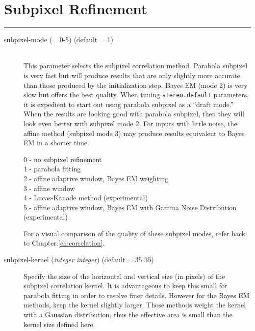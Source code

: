 \section{Subpixel Refinement}
\hrule
\bigskip

\begin{description}

\item[subpixel-mode \textnormal{\small{(= 0-5)}} (default = 1)] \hfill \\
  This parameter selects the subpixel correlation method. Parabola subpixel
  is very fast but will produce results that are only slightly more accurate
   than those produced by the initialization step. Bayes EM (mode 2)
  is very slow but offers the best quality. When tuning {\tt stereo.default}
  parameters, it is expedient to start out using parabola subpixel as a
  ``draft mode.'' When the results are looking good with parabola subpixel,
  then they  will look even better with subpixel mode 2.  For inputs with
  little noise, the affine method (subpixel mode 3) may produce results
  equivalent to Bayes EM in a shorter time.

  \begin{description}
    \item[0 - no subpixel refinement]
    \item[1 - parabola fitting ]
    \item[2 - affine adaptive window, Bayes EM weighting ]
    \item[3 - affine window ]
    \item[4 - Lucas-Kanade method (experimental)]
    \item[5 - affine adaptive window, Bayes EM with Gamma Noise Distribution (experimental) ]
  \end{description}

  For a visual comparison of the quality of these subpixel modes,
  refer back to Chapter:\ref{ch:correlation}.

\item[subpixel-kernel \textnormal{\small{(\emph{integer integer})}} (default = 35 35)]
  Specify the size of the horizontal and vertical size (in pixels) of
  the subpixel correlation kernel. It is advantageous to keep this
  small for parabola fitting in order to resolve finer
  details. However for the Bayes EM methods, keep the kernel slightly
  larger. Those methods weight the kernel with a Gaussian
  distribution, thus the effective area is small than the kernel size
  defined here.

\end{description}


